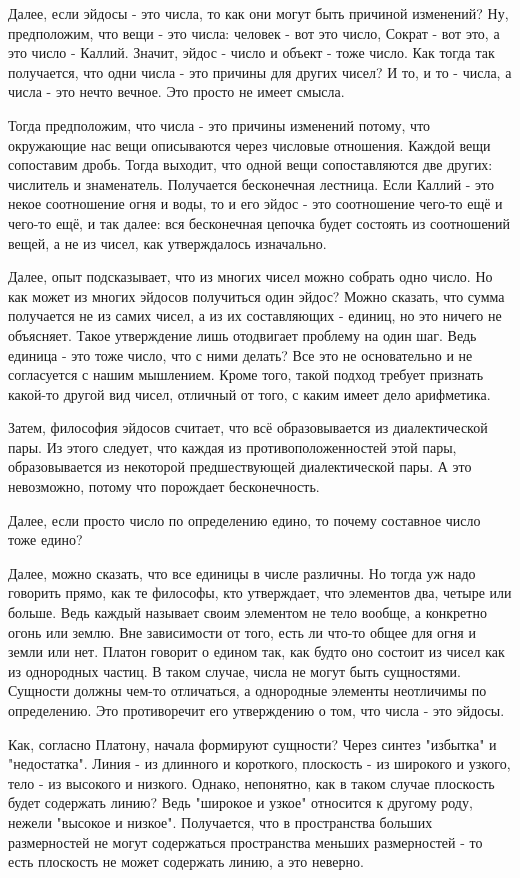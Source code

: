 \documentclass{article}
\begin{document}
Далее, если эйдосы - это числа, то как они могут быть причиной изменений? Ну, предположим, что вещи - это числа: человек - вот это число, Сократ - вот это, а это число - Каллий. Значит, эйдос - число и объект - тоже число. Как тогда так получается, что одни числа - это причины для других чисел? И то, и то - числа, а числа - это нечто вечное. Это просто не имеет смысла.

Тогда предположим, что числа - это причины изменений потому, что окружающие нас вещи описываются через числовые отношения. Каждой вещи сопоставим дробь. Тогда выходит, что одной вещи сопоставляются две других: числитель и знаменатель. Получается бесконечная лестница. Если Каллий - это некое соотношение огня и воды, то и его эйдос - это соотношение чего-то ещё и чего-то ещё, и так далее: вся бесконечная цепочка будет состоять из соотношений вещей, а не из чисел, как утверждалось изначально.

Далее, опыт подсказывает, что из многих чисел можно собрать одно число. Но как может из многих эйдосов получиться один эйдос? Можно сказать, что сумма получается не из самих чисел, а из их составляющих - единиц, но это ничего не объясняет. Такое утверждение лишь отодвигает проблему на один шаг. Ведь единица - это тоже число, что с ними делать? Все это не основательно и не согласуется с нашим мышлением. Кроме того, такой подход требует признать какой-то другой вид чисел, отличный от того, с каким имеет дело арифметика.

Затем, философия эйдосов считает, что всё образовывается из диалектической пары. Из этого следует, что каждая из противоположенностей этой пары, образовывается из некоторой предшествующей диалектической пары. А это невозможно, потому что порождает бесконечность.

Далее, если просто число по определению едино, то почему составное число тоже едино?

Далее, можно сказать, что все единицы в числе различны. Но тогда уж надо говорить прямо, как те философы, кто утверждает, что элементов два, четыре или больше. Ведь каждый называет своим элементом не тело вообще, а конкретно огонь или землю. Вне зависимости от того, есть ли что-то общее для огня и земли или нет. Платон говорит о едином так, как будто оно состоит из чисел как из однородных частиц. В таком случае, числа не могут быть сущностями. Сущности должны чем-то отличаться, а однородные элементы неотличимы по определению. Это противоречит его утверждению о том, что числа - это эйдосы.

Как, согласно Платону, начала формируют сущности? Через синтез "избытка" и "недостатка". Линия - из длинного и короткого, плоскость - из широкого и узкого, тело - из высокого и низкого. Однако, непонятно, как в таком случае плоскость будет содержать линию? Ведь "широкое и узкое" относится к другому роду, нежели "высокое и низкое". Получается, что в пространства больших размерностей не могут содержаться пространства меньших размерностей - то есть плоскость не может содержать линию, а это неверно.
\end{document}
